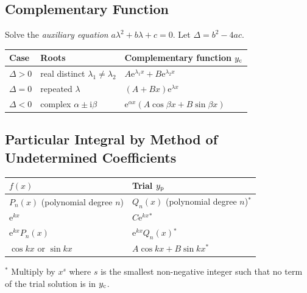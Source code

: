 \documentclass[12pt, a4paper]{book}
\newenvironment{keyresult}{%
  \begin{tcolorbox}[keystyle]%
}{%
  \end{tcolorbox}%
}
\newcommand{\e}{\mathrm{e}}
\newcommand{\ii}{\mathrm{i}}
\begin{document}
\subsection{Complementary Function}

Solve the \emph{auxiliary equation} $\displaystyle a\lambda^2+b\lambda+c=0$. Let $\displaystyle \Delta=b^2-4ac$.

\begin{keyresult}
\begin{center}
\begin{tabular}{lll}
\toprule
Case & Roots & Complementary function $\displaystyle y_{\rm c}$\\
\midrule
$\displaystyle \Delta>0$ & real distinct $\displaystyle \lambda_1\neq\lambda_2$ & $\displaystyle A\e^{\lambda_1 x}+B\e^{\lambda_2 x}$\\
$\displaystyle \Delta=0$ & repeated $\displaystyle \lambda$ & $\displaystyle (A+Bx)\e^{\lambda x}$\\
$\displaystyle \Delta<0$ & complex $\displaystyle \alpha\pm\ii\beta$ & $\displaystyle \e^{\alpha x}(A\cos\beta x+B\sin\beta x)$\\
\bottomrule
\end{tabular}
\end{center}
\end{keyresult}

\subsection{Particular Integral by Method of Undetermined Coefficients}

\begin{center}
\begin{tabular}{ll}
\toprule
$f(x)$ & Trial $y_{\rm p}$\\
\midrule
$P_n(x)$ (polynomial degree $n$) & $Q_n(x)$ (polynomial degree $n$)$^*$\\
$\e^{kx}$ & $C\e^{kx}$\;$^*$\\
$\e^{kx}P_n(x)$ & $\e^{kx}Q_n(x)$\;$^*$\\
$\cos kx$ or $\sin kx$ & $A\cos kx+B\sin kx$\;$^*$\\
\bottomrule
\end{tabular}
\end{center}
$^*$ Multiply by $x^s$ where $s$ is the smallest non-negative integer such that no term of the trial solution is in $y_{\rm c}$.
\end{document}
